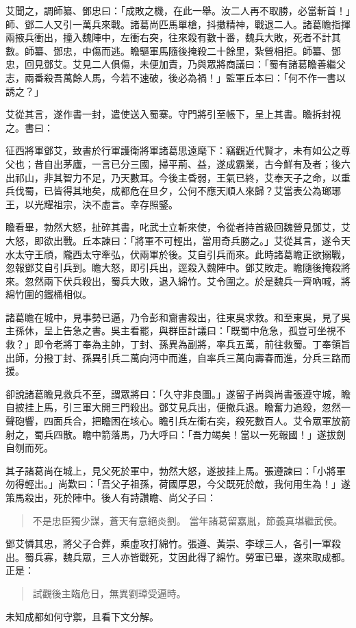 艾聞之，調師纂、鄧忠曰：「成敗之機，在此一舉。汝二人再不取勝，必當斬首！」師、鄧二人又引一萬兵來戰。諸葛尚匹馬單槍，抖擻精神，戰退二人。諸葛瞻指揮兩掖兵衝出，撞入魏陣中，左衝右突，往來殺有數十番，魏兵大敗，死者不計其數。師纂、鄧忠，中傷而逃。瞻驅軍馬隨後掩殺二十餘里，紮營相拒。師纂、鄧忠，回見鄧艾。艾見二人俱傷，未便加責，乃與眾將商議曰：「蜀有諸葛瞻善繼父志，兩番殺吾萬餘人馬，今若不速破，後必為禍！」監軍丘本曰：「何不作一書以誘之？」

艾從其言，遂作書一封，遣使送入蜀寨。守門將引至帳下，呈上其書。瞻拆封視之。書曰：

征西將軍鄧艾，致書於行軍護衛將軍諸葛思遠麾下：竊觀近代賢才，未有如公之尊父也；昔自出茅廬，一言已分三國，掃平荊、益，遂成霸業，古今鮮有及者；後六出祁山，非其智力不足，乃天數耳。今後主昏弱，王氣已終，艾奉天子之命，以重兵伐蜀，已皆得其地矣，成都危在旦夕，公何不應天順人來歸？艾當表公為瑯琊王，以光耀祖宗，決不虛言。幸存照鋻。

瞻看畢，勃然大怒，扯碎其書，叱武士立斬來使，令從者持首級回魏營見鄧艾，艾大怒，即欲出戰。丘本諫曰：「將軍不可輕出，當用奇兵勝之。」艾從其言，遂令天水太守王頎，隴西太守牽弘，伏兩軍於後。艾自引兵而來。此時諸葛瞻正欲搦戰，忽報鄧艾自引兵到。瞻大怒，即引兵出，逕殺入魏陣中。鄧艾敗走。瞻隨後掩殺將來。忽然兩下伏兵殺出，蜀兵大敗，退入綿竹。艾令圍之。於是魏兵一齊吶喊，將綿竹圍的鐵桶相似。

諸葛瞻在城中，見事勢已逼，乃令彭和齎書殺出，往東吳求救。和至東吳，見了吳主孫休，呈上告急之書。吳主看罷，與群臣計議曰：「既蜀中危急，孤豈可坐視不救？」即令老將丁奉為主帥，丁封、孫異為副將，率兵五萬，前往救蜀。丁奉領旨出師，分撥丁封、孫異引兵二萬向沔中而進，自率兵三萬向壽春而進，分兵三路而援。

卻說諸葛瞻見救兵不至，謂眾將曰：「久守非良圖。」遂留子尚與尚書張遵守城，瞻自披挂上馬，引三軍大開三門殺出。鄧艾見兵出，便撤兵退。瞻奮力追殺，忽然一聲砲響，四面兵合，把瞻困在垓心。瞻引兵左衝右突，殺死數百人。艾令眾軍放箭射之，蜀兵四散。瞻中箭落馬，乃大呼曰：「吾力竭矣！當以一死報國！」遂拔劍自刎而死。

其子諸葛尚在城上，見父死於軍中，勃然大怒，遂披挂上馬。張遵諫曰：「小將軍勿得輕出。」尚歎曰：「吾父子祖孫，荷國厚恩，今父既死於敵，我何用生為！」遂策馬殺出，死於陣中。後人有詩讚瞻、尚父子曰：

\begin{quote}
不是忠臣獨少謀，蒼天有意絕炎劉。
當年諸葛留嘉胤，節義真堪繼武侯。
\end{quote}

鄧艾憐其忠，將父子合葬，乘虛攻打綿竹。張遵、黃崇、李球三人，各引一軍殺出。蜀兵寡，魏兵眾，三人亦皆戰死，艾因此得了綿竹。勞軍已畢，遂來取成都。正是：

\begin{quote}
試觀後主臨危日，無異劉璋受逼時。
\end{quote}

未知成都如何守禦，且看下文分解。
